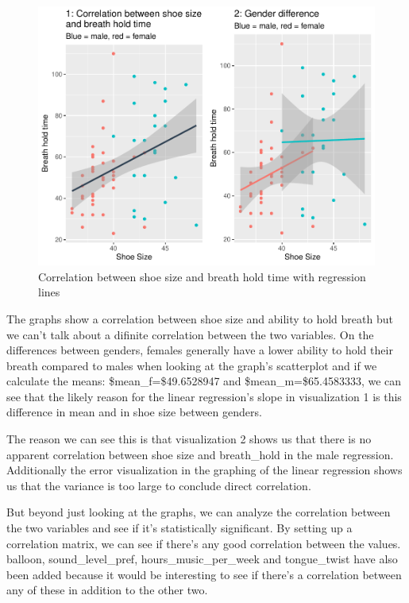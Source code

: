 \documentclass[]{article}
\begin{document}
\begin{figure}
\centering
\includegraphics{Personality-Data-Analysis-Portfolio-1_files/figure-latex/unnamed-chunk-14-1.pdf}
\caption{\label{fig:unnamed-chunk-14}Correlation between shoe size and breath hold time with regression lines}
\end{figure}

The graphs show a correlation between shoe size and ability to hold breath but we can't talk about a difinite correlation between the two variables. On the differences between genders, females generally have a lower ability to hold their breath compared to males when looking at the graph's scatterplot and if we calculate the means: \$mean\_f=\$49.6528947 and \$mean\_m=\$65.4583333, we can see that the likely reason for the linear regression's slope in visualization 1 is this difference in mean and in shoe size between genders.

The reason we can see this is that visualization 2 shows us that there is no apparent correlation between shoe size and breath\_hold in the male regression. Additionally the error visualization in the graphing of the linear regression shows us that the variance is too large to conclude direct correlation.

But beyond just looking at the graphs, we can analyze the correlation between the two variables and see if it's statistically significant. By setting up a correlation matrix, we can see if there's any good correlation between the values. balloon, sound\_level\_pref, hours\_music\_per\_week and tongue\_twist have also been added because it would be interesting to see if there's a correlation between any of these in addition to the other two.
\end{document}
